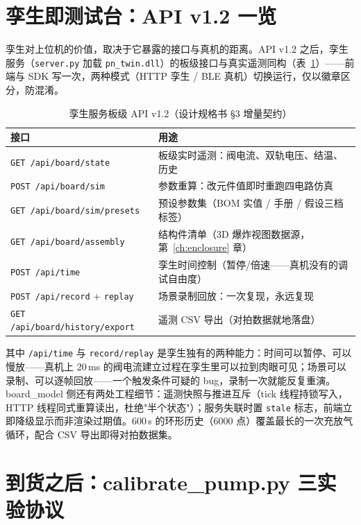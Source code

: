 \section{孪生即测试台：API v1.2 一览}
\label{sec:twin-api}

孪生对上位机的价值，取决于它暴露的接口与真机的距离。API v1.2 之后，孪生服务（\texttt{server.py} 加载 \texttt{pn\_twin.dll}）的板级接口与真实遥测同构（表~\ref{tab:twin-apis}）——前端与 SDK 写一次，两种模式（HTTP 孪生 / BLE 真机）切换运行，仅以徽章区分，防混淆。

\begin{table}[htbp]
  \centering
  \caption{孪生服务板级 API v1.2（设计规格书 \S3 增量契约）}
  \label{tab:twin-apis}
  \begin{tabular}{lp{8.8cm}}
    \toprule
    接口 & 用途 \\
    \midrule
    \texttt{GET /api/board/state} & 板级实时遥测：阀电流、双轨电压、结温、历史 \\
    \texttt{POST /api/board/sim} & 参数重算：改元件值即时重跑四电路仿真 \\
    \texttt{GET /api/board/sim/presets} & 预设参数集（BOM 实值 / 手册 / 假设三档标签） \\
    \texttt{GET /api/board/assembly} & 结构件清单（3D 爆炸视图数据源，第~\ref{ch:enclosure} 章） \\
    \texttt{POST /api/time} & 孪生时间控制（暂停/倍速——真机没有的调试自由度） \\
    \texttt{POST /api/record} + \texttt{replay} & 场景录制回放：一次复现，永远复现 \\
    \texttt{GET /api/board/history/export} & 遥测 CSV 导出（对拍数据就地落盘） \\
    \bottomrule
  \end{tabular}
\end{table}

其中 \texttt{/api/time} 与 \texttt{record/replay} 是孪生独有的两种能力：时间可以暂停、可以慢放——真机上 20\,ms 的阀电流建立过程在孪生里可以拉到肉眼可见；场景可以录制、可以逐帧回放——一个触发条件可疑的 bug，录制一次就能反复重演。board\_model 侧还有两处工程细节：遥测快照与推进互斥（tick 线程持锁写入，HTTP 线程同式重算读出，杜绝"半个状态"）；服务失联时置 \texttt{stale} 标志，前端立即降级显示而非渲染过期值。600\,s 的环形历史（6000 点）覆盖最长的一次充放气循环，配合 CSV 导出即得对拍数据集。

\section{到货之后：calibrate\_pump.py 三实验协议}
\label{sec:twin-calib}

